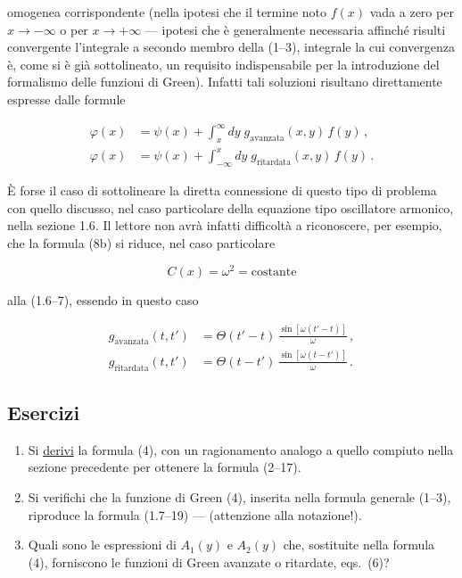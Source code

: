 \documentclass[11pt, a4paper]{book}
\numberwithin{equation}{section}
\newenvironment{esercizi}{\subsection*{Esercizi}\begin{enumerate}}{\end{enumerate}}
\begin{document}

omogenea corrispondente (nella ipotesi che il termine noto $f(x)$ vada a zero per $x \to -\infty$ o per $x \to +\infty$ --- ipotesi che è generalmente necessaria affinché risulti convergente l'integrale a secondo membro della (1--3), integrale la cui convergenza è, come si è già sottolineato, un requisito indispensabile per la introduzione del formalismo delle funzioni di Green). Infatti tali soluzioni risultano direttamente espresse dalle formule

\begin{align}
\tag{8a} \varphi(x) &= \psi(x) + \int_x^{\infty} dy\; g_{\text{avanzata}}(x,y)\,f(y)\,, \\
\tag{8b} \varphi(x) &= \psi(x) + \int_{-\infty}^{x} dy\; g_{\text{ritardata}}(x,y)\,f(y)\,.
\end{align}

È forse il caso di sottolineare la diretta connessione di questo tipo di problema con quello discusso, nel caso particolare della equazione tipo oscillatore armonico, nella sezione 1.6. Il lettore non avrà infatti difficoltà a riconoscere, per esempio, che la formula (8b) si riduce, nel caso particolare

\begin{equation}
\tag{9} C(x) = \omega^2 = \text{costante}
\end{equation}

alla (1.6--7), essendo in questo caso

\begin{align}
\tag{10a} g_{\text{avanzata}}(t,t') &= \Theta(t'-t)\,\frac{\sin[\omega(t'-t)]}{\omega}\,, \\
\tag{10b} g_{\text{ritardata}}(t,t') &= \Theta(t-t')\,\frac{\sin[\omega(t-t')]}{\omega}\,.
\end{align}

\begin{esercizi}
\item Si \uline{derivi} la formula (4), con un ragionamento analogo a quello compiuto nella sezione precedente per ottenere la formula (2--17).
\item Si verifichi che la funzione di Green (4), inserita nella formula generale (1--3), riproduce la formula (1.7--19) --- (attenzione alla notazione!).


\item Quali sono le espressioni di $A_1(y)$ e $A_2(y)$ che, sostituite nella formula (4), forniscono le funzioni di Green avanzate o ritardate, eqs.\ (6)?
\end{esercizi}
\end{document}
